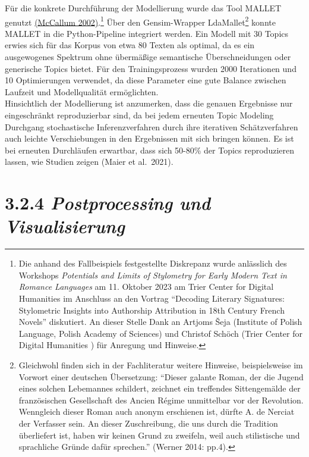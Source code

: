 \documentclass[
  12pt,
  letterpaper,
  DIV=11,
  numbers=noendperiod]{scrreprt}
\begin{document}
Für die konkrete Durchführung der Modellierung wurde das Tool MALLET
genutzt \href{https://www.zotero.org/google-docs/?MccIFl}{(McCallum
2002)}.\footnote{Die anhand des Fallbeispiels festgestellte Diskrepanz
  wurde anlässlich des Workshops \emph{Potentials and Limits of
  Stylometry for Early Modern Text in Romance Languages} am 11. Oktober
  2023 am Trier Center for Digital Humanities im Anschluss an den
  Vortrag ``Decoding Literary Signatures: Stylometric Insights into
  Authorship Attribution in 18th Century French Novels'' diskutiert. An
  dieser Stelle Dank an Artjoms Šeja (Institute of Polish Language,
  Polish Academy of Sciences) und Christof Schöch (Trier Center for
  Digital Humanities ) für Anregung und Hinweise.} Über den
Gensim-Wrapper LdaMallet\footnote{Gleichwohl finden sich in der
  Fachliteratur weitere Hinweise, beispielsweise im Vorwort einer
  deutschen Übersetzung: ``Dieser galante Roman, der die Jugend eines
  solchen Lebemannes schildert, zeichnet ein treffendes Sittengemälde
  der französischen Gesellschaft des Ancien Régime unmittelbar vor der
  Revolution. Wenngleich dieser Roman auch anonym erschienen ist, dürfte
  A. de Nerciat der Verfasser sein. An dieser Zuschreibung, die uns
  durch die Tradition überliefert ist, haben wir keinen Grund zu
  zweifeln, weil auch stilistische und sprachliche Gründe dafür
  sprechen.'' (Werner 2014: pp.4).} konnte MALLET in die Python-Pipeline
integriert werden. Ein Modell mit 30 Topics erwies sich für das Korpus
von etwa 80 Texten als optimal, da es ein ausgewogenes Spektrum ohne
übermäßige semantische Überschneidungen oder generische Topics bietet.
Für den Trainingsprozess wurden 2000 Iterationen und 10 Optimierungen
verwendet, da diese Parameter eine gute Balance zwischen Laufzeit und
Modellqualität ermöglichten.\\
Hinsichtlich der Modellierung ist anzumerken, dass die genauen
Ergebnisse nur eingeschränkt reproduzierbar sind, da bei jedem erneuten
Topic Modeling Durchgang stochastische Inferenzverfahren durch ihre
iterativen Schätzverfahren auch leichte Verschiebungen in den
Ergebnissen mit sich bringen können. Es ist bei erneuten Durchläufen
erwartbar, dass sich 50-80\% der Topics reproduzieren lassen, wie
Studien zeigen (Maier et al.~2021).

\section{\texorpdfstring{3.2.4 \emph{Postprocessing und
Visualisierung}}{3.2.4 Postprocessing und Visualisierung}}\label{postprocessing-und-visualisierung}
\end{document}
